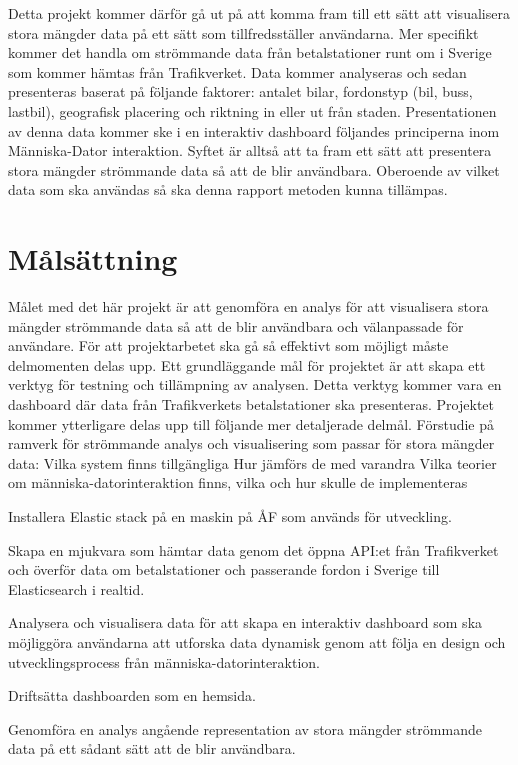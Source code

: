 \documentclass{kththesis}
\begin{document}
Detta projekt kommer därför gå ut på att komma fram till ett sätt att visualisera stora mängder data på ett sätt som tillfredsställer användarna. Mer specifikt kommer det handla om strömmande data från betalstationer runt om i Sverige som kommer hämtas från Trafikverket. Data kommer analyseras och sedan presenteras baserat på följande faktorer: antalet bilar, fordonstyp (bil, buss, lastbil), geografisk placering och riktning in eller ut från staden. Presentationen av denna data kommer ske i en interaktiv dashboard följandes principerna inom Människa-Dator interaktion. Syftet är alltså att ta fram ett sätt att presentera stora mängder strömmande data så att de blir användbara. Oberoende av vilket data som ska användas så ska denna rapport metoden kunna tillämpas.


\section{Målsättning}
Målet med det här projekt är att genomföra en analys för att visualisera stora mängder strömmande data så att de blir användbara och välanpassade för användare. För att projektarbetet ska gå så effektivt som möjligt måste delmomenten delas upp. Ett grundläggande mål för projektet är att skapa ett verktyg för testning och tillämpning av analysen. Detta verktyg kommer vara en dashboard där data från Trafikverkets betalstationer ska presenteras. Projektet kommer ytterligare delas upp till följande mer detaljerade delmål.
Förstudie på ramverk för strömmande analys och visualisering som passar för stora mängder data: 
Vilka system finns tillgängliga
Hur jämförs de med varandra
Vilka teorier om människa-datorinteraktion finns, vilka  och hur skulle de implementeras	


Installera Elastic stack på en maskin på ÅF som används för utveckling.


Skapa en mjukvara som hämtar data genom det öppna API:et från Trafikverket och överför data om betalstationer och passerande fordon i Sverige till Elasticsearch i realtid.


Analysera och visualisera data för att skapa en interaktiv dashboard som ska möjliggöra användarna att utforska data dynamisk genom att följa en design och utvecklingsprocess från människa-datorinteraktion.	
			 	
Driftsätta dashboarden som en hemsida.	


Genomföra en analys angående representation av stora mängder strömmande data på ett sådant sätt att de blir användbara.	
\end{document}
